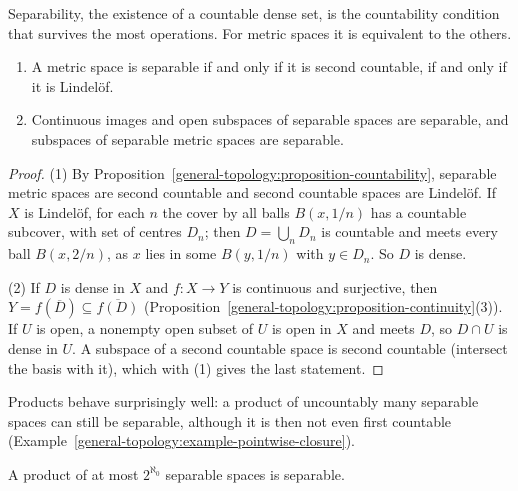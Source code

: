 Separability, the existence of a countable dense set, is the countability condition that survives the most operations. For metric spaces it is equivalent to the others.

\begin{proposition}\label{general-topology:proposition-separability}
\begin{enumerate}
\item A metric space is separable if and only if it is second countable, if and only if it is Lindel\"of.
\item Continuous images and open subspaces of separable spaces are separable, and subspaces of separable metric spaces are separable.
\end{enumerate}
\end{proposition}

\begin{proof}
(1) By Proposition~\ref{general-topology:proposition-countability}, separable metric spaces are second countable and second countable spaces are Lindel\"of. If $X$ is Lindel\"of, for each $n$ the cover by
all balls $B(x, 1/n)$ has a countable subcover, with set of centres $D_n$; then $D = \bigcup_nD_n$ is countable and meets every ball $B(x, 2/n)$, as $x$ lies in some $B(y, 1/n)$ with $y \in D_n$. So $D$ is dense.

(2) If $D$ is dense in $X$ and $f \colon X \to Y$ is continuous and surjective, then $Y = f(\overline{D}) \subseteq \overline{f(D)}$ (Proposition~\ref{general-topology:proposition-continuity}(3)). If $U$ is open, a nonempty
open subset of $U$ is open in $X$ and meets $D$, so $D \cap U$ is dense in $U$. A subspace of a second countable space is second countable (intersect the basis with it), which with (1) gives the last statement.
\end{proof}

Products behave surprisingly well: a product of uncountably many separable spaces can still be separable, although it is then not even first countable (Example~\ref{general-topology:example-pointwise-closure}).

\begin{theorem}\label{general-topology:theorem-hmp}
A product of at most $2^{\aleph_0}$ separable spaces is separable.
\end{theorem}

